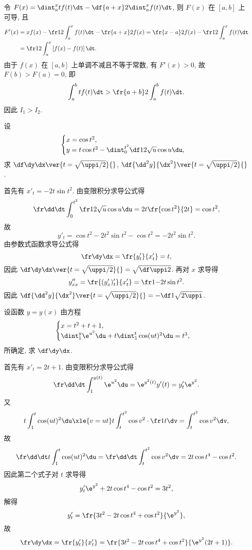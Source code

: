 \documentclass{ctexart}
\begin{document}
\begin{solution}
    令 $F(x)=\dint_a^xtf(t)\dt-\df{a+x}2\dint_a^xf(t)\dt$, 则 $F(x)$ 在 $[a,b]$ 上可导, 且 \[\begin{aligned}
        F'(x)&=xf(x)-\fr12\int_a^xf(t)\dt-\fr{a+x}2f(x)=\fr{x-a}2f(x)-\fr12\int_a^xf(t)\dt\\
        &=\fr12\int_a^x\left[f(x)-f(t)\right]\dt.
    \end{aligned}\] 由于 $f(x)$ 在 $[a,b]$ 上单调不减且不等于常数, 有 $F'(x)>0$, 故 $F(b)>F(a)=0$, 即 \[
        \int_a^btf(t)\dt>\fr{a+b}2\int_a^bf(t)\dt.
    \] 因此 $I_1>I_2$.
\end{solution}

\begin{exercise}
    设 \[\begin{cases}
        x=\cos t^2,\\
        y=t\cos t^2-\dint_0^{t^2}\df1{2\sqrt u}\cos u\du,
    \end{cases}\] 求 $\df\dy\dx\ver{t=\sqrt{\uppi/2}}{}$, $\df{\dd^2y}{\dx^2}\ver{t=\sqrt{\uppi/2}}{}$.
\end{exercise}

\begin{solution}
    首先有 $x'_t=-2t\sin t^2$. 由变限积分求导公式得 \[
        \fr\dd\dt\int_0^{t^2}\fr1{2\sqrt u}\cos u\du=2t\fr{\cos t^2}{2t}=\cos t^2,
    \] 故 \[
        y'_t=\cos t^2-2t^2\sin t^2-\cos t^2=-2t^2\sin t^2.
    \] 由参数式函数求导公式得 \[
        \fr\dy\dx=\fr{y'_t}{x'_t}=t,
    \] 因此 $\df\dy\dx\ver{t=\sqrt{\uppi/2}}{}=\sqrt{\df\uppi2}$. 再对 $x$ 求导得 \[
        y''_{xx}=\fr{(y'_x)'_t}{x'_t}=\fr1{-2t\sin t^2}.
    \] 因此 $\df{\dd^2y}{\dx^2}\ver{t=\sqrt{\uppi/2}}{}=-\df1{\sqrt{2\uppi}}$.
\end{solution}

\begin{exercise}
    设函数 $y=y(x)$ 由方程 \[\begin{cases}
        x=t^2+t+1,\\
        \dint_1^y\e^{u^2}\du+t\dint_1^t\cos(ut)^2\du=t^3,
    \end{cases}\] 所确定, 求 $\df\dy\dx$.
\end{exercise}

\begin{solution}
    首先有 $x'_t=2t+1$. 由变限积分求导公式得 \[
        \fr\dd\dt\int_1^{y(t)}\e^{u^2}\du=\e^{y^2(t)}y'(t)=y'_t\e^{y^2}.
    \] 又 \[
        t\int_1^t\cos(ut)^2\du\xle{v=ut}t\int_t^{t^2}\cos v^2\cdot\fr1t\dv=\int_t^{t^2}\cos v^2\dv,
    \] 故 \[
        \fr\dd\dt t\int_1^t\cos(ut)^2\du=\fr\dd\dt\int_t^{t^2}\cos v^2\dv=2t\cos t^4-\cos t^2.
    \] 因此第二个式子对 $t$ 求导得 \[
        y'_t\e^{y^2}+2t\cos t^4-\cos t^2=3t^2,
    \] 解得 \[
        y'_t=\fr{3t^2-2t\cos t^4+\cos t^2}{\e^{y^2}},
    \] 故 \[
        \fr\dy\dx=\fr{y'_t}{x'_t}=\fr{3t^2-2t\cos t^4+\cos t^2}{\e^{y^2}(2t+1)}.
    \]
\end{solution}
\end{document}

